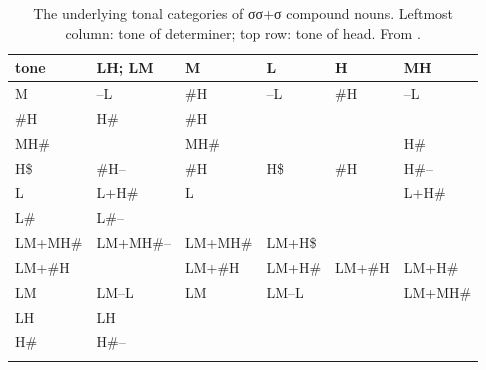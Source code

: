 \begin{refsection}
\begin{subtables}
		\begin{table}%
		\small
			\caption{\label{tab:abstractmonosyllabicdisyllablesREF}The underlying tonal categories of σσ+σ compound
				nouns. Leftmost column: tone of determiner; top row: tone of head. From .}
			{\renewcommand{\arraystretch}{1.35}
				\begin{tabularx}{\textwidth}{ Q P{18mm} Q Q Q Q }
					\lsptoprule
					tone & LH; LM & M & L & H & MH\\ \midrule
					M & --L & \#H & --L & \#H & --L\\
					\#H & H\# & \#H &  &
					\hspace*{\fill} & \hspace*{\fill}\\
					MH\# & \hspace*{\fill} & MH\# &  &  \hspace*{\fill}& H\#\\
					H\$ & \#H-- & \#H & H\$ & \#H & H\#--\\
					L & L+H\# & L &  & \hspace*{\fill} & L+H\#\\
					L\# & L\#-- &  &  &  & \hspace*{\fill}\\
					LM+MH\# & LM+MH\#-- & LM+MH\# & LM+H\$ &  & \hspace*{\fill}\\
					LM+\#H &  \hspace*{\fill}& LM+\#H & LM+H\# & LM+\#H & LM+H\#\\
					LM & LM--L & LM & LM--L &
					\hspace*{\fill} & LM+MH\#\\
					LH & LH &  &  &  & \hspace*{\fill}\\
					H\# & H\#-- &  &  &  & \hspace*{\fill}\\ 
					\lspbottomrule
				\end{tabularx}}
	\end{table}
			

\end{subtables}
\end{refsection}
